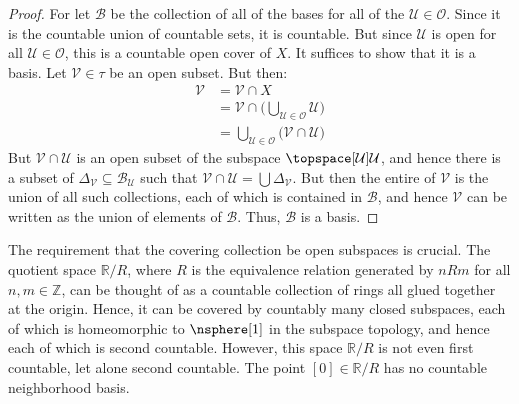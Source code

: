 \documentclass{article}                                                        %
\begin{document}
            \begin{proof}
                For let $\mathcal{B}$ be the collection of all of the bases for all
                of the $\mathcal{U}\in\mathcal{O}$. Since it is the countable union
                of countable sets, it is countable. But since $\mathcal{U}$ is open
                for all $\mathcal{U}\in\mathcal{O}$, this is a countable open cover
                of $X$. It suffices to show that it is a basis. Let
                $\mathcal{V}\in\tau$ be an open subset. But then:
                \begin{align}
                    \mathcal{V}&=\mathcal{V}\cap{X}\\
                    &=\mathcal{V}\cap\Big(
                        \bigcup_{\mathcal{U}\in\mathcal{O}}\mathcal{U}
                    \Big)\\
                    &=\bigcup_{\mathcal{U}\in\mathcal{O}}
                        \big(\mathcal{V}\cap\mathcal{U}\big)
                \end{align}
                But $\mathcal{V}\cap\mathcal{U}$ is an open subset of the subspace
                $\topspace[\mathcal{U}]{\mathcal{U}}$, and hence there is a subset
                of $\Delta_{\mathcal{V}}\subseteq\mathcal{B}_{\mathcal{U}}$ such
                that $\mathcal{V}\cap\mathcal{U}=\bigcup\Delta_{\mathcal{V}}$. But
                then the entire of $\mathcal{V}$ is the union of all such
                collections, each of which is contained in $\mathcal{B}$, and hence
                $\mathcal{V}$ can be written as the union of elements of
                $\mathcal{B}$. Thus, $\mathcal{B}$ is a basis.
            \end{proof}
            The requirement that the covering collection be open subspaces is
            crucial. The quotient space $\mathbb{R}/R$, where $R$ is the equivalence
            relation generated by $nRm$ for all $n,m\in\mathbb{Z}$, can be thought
            of as a countable collection of rings all glued together at the origin.
            Hence, it can be covered by countably many closed subspaces, each of
            which is homeomorphic to $\nsphere[1]$ in the subspace topology, and
            hence each of which is second countable. However, this space
            $\mathbb{R}/R$ is not even first countable, let alone second countable.
            The point $[0]\in\mathbb{R}/R$ has no countable neighborhood basis.
\end{document}
